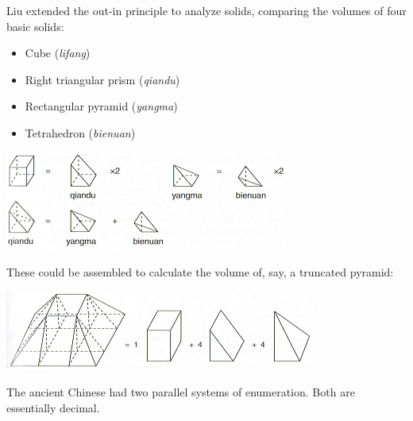 Liu extended the out-in principle to analyze solids, comparing the volumes of four basic solids:\par
\begin{minipage}[t]{0.4\linewidth}\vspace{0pt}
\begin{itemize}
  \item Cube (\emph{lifang})
  \item Right triangular prism (\emph{qiandu})
  \item Rectangular pyramid (\emph{yangma})
  \item Tetrahedron (\emph{bienuan})
\end{itemize}
\end{minipage}\hfill\begin{minipage}[t]{0.59\linewidth}\vspace{0pt}
\flushright\includegraphics[scale=1]{fund-pieces-small}
\end{minipage}\medbreak
These could be assembled to calculate the volume of, say, a truncated pyramid:
\begin{center}
\includegraphics[scale=1]{pyramid-small}
\end{center}
\goodbreak





The ancient Chinese had two parallel systems of enumeration. Both are essentially decimal.

  
